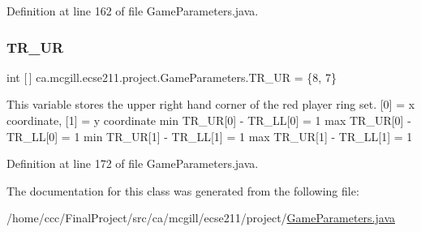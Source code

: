Definition at line 162 of file Game\+Parameters.\+java.

\mbox{\label{classca_1_1mcgill_1_1ecse211_1_1project_1_1_game_parameters_a45c465e9f0b53a4e752a398036be13f5}} 
\subsubsection{\texorpdfstring{T\+R\+\_\+\+UR}{TR\_UR}}
{\footnotesize\ttfamily int \mbox{[}$\,$\mbox{]} ca.\+mcgill.\+ecse211.\+project.\+Game\+Parameters.\+T\+R\+\_\+\+UR = \{8, 7\}\hspace{0.3cm}{\ttfamily [static]}}

This variable stores the upper right hand corner of the red player ring set. \mbox{[}0\mbox{]} = x coordinate, \mbox{[}1\mbox{]} = y coordinate min T\+R\+\_\+\+UR\mbox{[}0\mbox{]} -\/ T\+R\+\_\+\+LL\mbox{[}0\mbox{]} = 1 max T\+R\+\_\+\+UR\mbox{[}0\mbox{]} -\/ T\+R\+\_\+\+LL\mbox{[}0\mbox{]} = 1 min T\+R\+\_\+\+UR\mbox{[}1\mbox{]} -\/ T\+R\+\_\+\+LL\mbox{[}1\mbox{]} = 1 max T\+R\+\_\+\+UR\mbox{[}1\mbox{]} -\/ T\+R\+\_\+\+LL\mbox{[}1\mbox{]} = 1 

Definition at line 172 of file Game\+Parameters.\+java.



The documentation for this class was generated from the following file\+:\begin{DoxyCompactItemize}
\item 
/home/ccc/\+Final\+Project/src/ca/mcgill/ecse211/project/\hyperlink{_game_parameters_8java}{Game\+Parameters.\+java}\end{DoxyCompactItemize}
